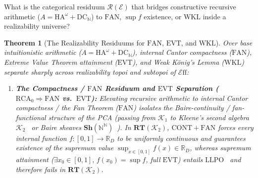 \documentclass[10pt,twoside,openright]{book}
\theoremstyle{crmplain}
\newtheorem{theorem}{Theorem}[section]
\theoremstyle{crmdef}
\theoremstyle{crmremark}
\newcommand{\Eff}{\mathcal{E}\mathrm{ff}}
\begin{document}
What is the categorical residuum $\mathcal{R}(\mathcal{E})$ that bridges constructive recursive arithmetic ($A = \mathrm{HA}^\omega + \mathrm{DC}_{\mathbb{N}}$) to $\mathrm{FAN}$, $\sup f$ existence, or $\mathrm{WKL}$ inside a realizability universe?

\begin{theorem}[The Realizability Residuums for $\mathrm{FAN}$, $\mathrm{EVT}$, and $\mathrm{WKL}$]\label{thm:realizability-fan-wkl}%
%
Over base intuitionistic arithmetic ($A = \mathrm{HA}^\omega + \mathrm{DC}_{\mathbb{N}}$), internal Cantor compactness ($\mathrm{FAN}$), Extreme Value Theorem attainment ($\mathrm{EVT}$), and Weak K\"onig's Lemma ($\mathrm{WKL}$) separate sharply across realizability topoi and subtopoi of $\Eff$:
\begin{enumerate}[label=(\arabic*),leftmargin=2em]

  \item \textbf{The Compactness / $\mathrm{FAN}$ Residuum and $\mathrm{EVT}$ Separation ($\mathrm{RCA}_0 \Rightarrow \mathrm{FAN}$ vs.\ $\mathrm{EVT}$):} Elevating recursive arithmetic to internal Cantor compactness / the Fan Theorem ($\mathrm{FAN}$) isolates the \emph{Baire-continuity / fan-functional structure} of the PCA (passing from $\mathcal{K}_1$ to Kleene's second algebra $\mathcal{K}_2$~\cite[\S 4.3]{vanOosten08} or Baire sheaves $\mathbf{Sh}(\mathbb{N}^{\mathbb{N}})$~\cite[Thm.~3.2]{FourmanHyland79}). In $\mathbf{RT}(\mathcal{K}_2)$, $\mathrm{CONT} + \mathrm{FAN}$ forces every internal function $f : [0,1] \to \mathbb{R}_D$ to be uniformly continuous and guarantees existence of the \emph{supremum value} $\sup_{x \in [0,1]} f(x) \in \mathbb{R}_D$, whereas \emph{supremum attainment} ($\exists x_0 \in [0,1],\, f(x_0) = \sup f$, full $\mathrm{EVT}$) entails $\mathrm{LLPO}$~\cite[Ch.~2]{BridgesRichman87} and therefore \emph{fails} in $\mathbf{RT}(\mathcal{K}_2)$.


\end{enumerate}
\end{theorem}
\end{document}
